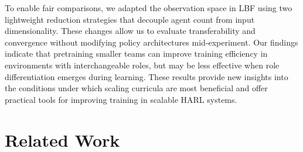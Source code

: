 \documentclass{article}
\begin{document}
To enable fair comparisons, we adapted the observation space in LBF 
using two lightweight reduction strategies that decouple agent count from input dimensionality. 
These changes allow us to evaluate transferability and convergence without modifying 
policy architectures mid-experiment. Our findings indicate that pretraining smaller teams 
can improve training efficiency in environments with interchangeable roles, 
but may be less effective when role differentiation emerges during learning. 
These results provide new insights into the conditions under which scaling curricula are 
most beneficial and offer practical tools for improving training in scalable HARL systems.




\section{Related Work}





\end{document}
